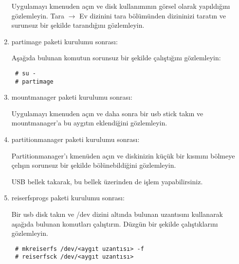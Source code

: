 \documentclass[a4paper,10pt]{article}
\begin{document}
\begin{enumerate}
Uygulamayı kmenuden açın ve disk kullanımının görsel olarak yapıldığını gözlemleyin. Tara $\rightarrow$ Ev dizinini tara bölümünden dizininizi taratın ve surunsuz bir şekilde tarandığını gözlemleyin.
 \item partimage paketi kurulumu sonrası:

Aşağıda bulunan komutun sorunsuz bir şekilde çalıştığını gözlemleyin:
\begin{verbatim}
 # su -
 # partimage
\end{verbatim}

 \item mountmanager paketi kurulumu sonrası:

Uygulamayı kmenuden açın ve daha sonra bir usb stick takın ve mountmanager'a bu aygıtın eklendiğini gözlemleyin.
 \item partitionmanager paketi kurulumu sonrası:

Partitionmanager'ı kmenüden açın ve diskinizin küçük bir kısmını bölmeye çelışın sorunsuz bir şekilde bölünebildiğini gözlemleyin.

USB bellek takarak, bu bellek üzerinden de işlem yapabilirsiniz.

\item reiserfsprogs paketi kurulumu sonrası:

Bir usb disk takın ve /dev dizini altında bulunan uzantısını kullanarak aşağıda bulunan komutları çalıştırın. Düzgün bir şekilde çalıştıklarını gözlemleyin. 

\begin{verbatim}
 # mkreiserfs /dev/<aygıt uzantısı> -f
 # reiserfsck /dev/<aygıt uzantısı>
\end{verbatim}

\end{enumerate}
\end{document}
